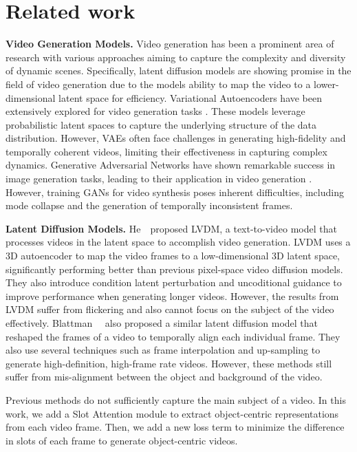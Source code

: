 \section{Related work}

\vspace{2mm}
\noindent\textbf{Video Generation Models.}
Video generation has been a prominent area of research with various approaches aiming to capture the complexity and diversity of dynamic scenes. Specifically, latent diffusion models are showing promise in the field of video generation due to the models ability to map the video to a lower-dimensional latent space for efficiency. 
Variational Autoencoders have been extensively explored for video generation tasks \cite{he2018probabilistic}. These models leverage probabilistic latent spaces to capture the underlying structure of the data distribution. However, VAEs often face challenges in generating high-fidelity and temporally coherent videos, limiting their effectiveness in capturing complex dynamics.
Generative Adversarial Networks have shown remarkable success in image generation tasks, leading to their application in video generation \cite{tian2021good}. However, training GANs for video synthesis poses inherent difficulties, including mode collapse and the generation of temporally inconsistent frames.

\vspace{2mm}
\noindent\textbf{Latent Diffusion  Models.}
He~\etal~proposed LVDM, a text-to-video model that processes videos in the latent space to accomplish video generation. 
LVDM uses a 3D autoencoder to map the video frames to a low-dimensional 3D latent space, significantly performing better than previous pixel-space video diffusion models.
They also introduce condition latent perturbation and uncoditional guidance to improve performance when generating longer videos.
However, the results from LVDM suffer from flickering and also cannot focus on the subject of the video effectively.
Blattman~\etal~\cite{blattmann2023align} also proposed a similar latent diffusion model that reshaped the frames of a video to temporally align each individual frame. 
They also use several techniques such as frame interpolation and up-sampling to generate high-definition, high-frame rate videos. 
However, these methods still suffer from mis-alignment between the object and background of the video. 

Previous methods do not sufficiently capture the main subject of a video. In this work, we add a Slot Attention module to extract object-centric representations from each video frame. Then, we add a new loss term to minimize the difference in slots of each frame to generate object-centric videos.
